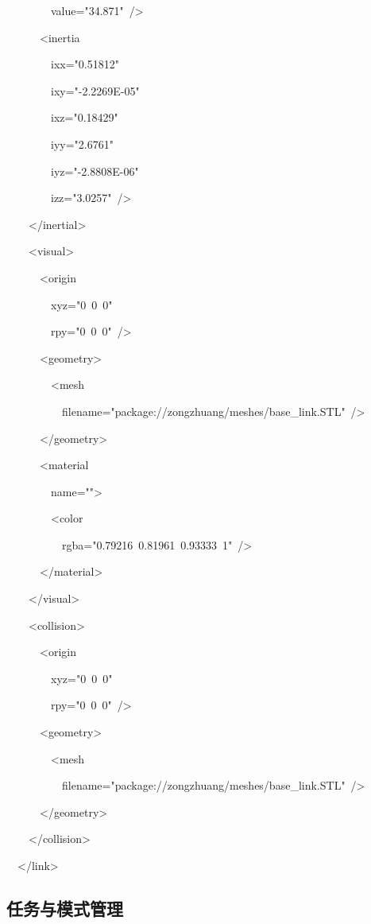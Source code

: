 ~~~~~~~~value="34.871"~/\textgreater{}

~~~~~~\textless inertia

~~~~~~~~ixx="0.51812"

~~~~~~~~ixy="-2.2269E-05"

~~~~~~~~ixz="0.18429"

~~~~~~~~iyy="2.6761"

~~~~~~~~iyz="-2.8808E-06"

~~~~~~~~izz="3.0257"~/\textgreater{}

~~~~\textless/inertial\textgreater{}

~~~~\textless visual\textgreater{}

~~~~~~\textless origin

~~~~~~~~xyz="0~0~0"

~~~~~~~~rpy="0~0~0"~/\textgreater{}

~~~~~~\textless geometry\textgreater{}

~~~~~~~~\textless mesh

~~~~~~~~~~filename="package://zongzhuang/meshes/base\_link.STL"~/\textgreater{}

~~~~~~\textless/geometry\textgreater{}

~~~~~~\textless material

~~~~~~~~name=""\textgreater{}

~~~~~~~~\textless color

~~~~~~~~~~rgba="0.79216~0.81961~0.93333~1"~/\textgreater{}

~~~~~~\textless/material\textgreater{}

~~~~\textless/visual\textgreater{}

~~~~\textless collision\textgreater{}

~~~~~~\textless origin

~~~~~~~~xyz="0~0~0"

~~~~~~~~rpy="0~0~0"~/\textgreater{}

~~~~~~\textless geometry\textgreater{}

~~~~~~~~\textless mesh

~~~~~~~~~~filename="package://zongzhuang/meshes/base\_link.STL"~/\textgreater{}

~~~~~~\textless/geometry\textgreater{}

~~~~\textless/collision\textgreater{}

~~\textless/link\textgreater{}

\subsection{任务与模式管理}

